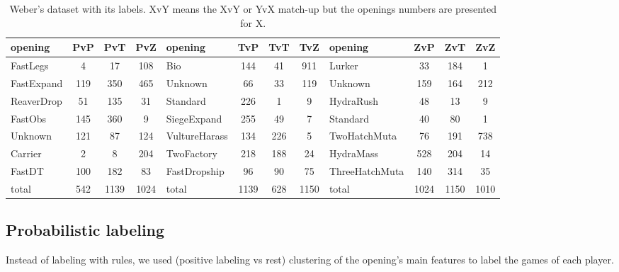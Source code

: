 \begin{table}[!h]
\begin{center}
\begin{footnotesize}
\begin{tabular}{|l|c|c|c|l|c|c|c|l|c|c|c|}
\hline
opening & PvP & PvT & PvZ & opening & TvP & TvT & TvZ & opening & ZvP & ZvT & ZvZ \\
\hline
FastLegs & 4 & 17 & 108 & Bio & 144 & 41 & 911 & Lurker & 33 & 184 & 1 \\
FastExpand & 119 & 350 & 465 & Unknown & 66 & 33 & 119 & Unknown & 159 & 164 & 212 \\
ReaverDrop & 51 & 135 & 31 & Standard & 226 & 1 & 9 & HydraRush & 48 & 13 & 9 \\
FastObs & 145 & 360 & 9 & SiegeExpand & 255 & 49 & 7 & Standard & 40 & 80 & 1 \\
Unknown & 121 & 87 & 124 & VultureHarass & 134 & 226 & 5 & TwoHatchMuta & 76 & 191 & 738 \\
Carrier & 2 & 8 & 204 & TwoFactory & 218 & 188 & 24 &  HydraMass & 528 & 204 & 14 \\
FastDT & 100 & 182 & 83 & FastDropship & 96 & 90 & 75 & ThreeHatchMuta & 140 & 314 & 35 \\
\hline
total & 542 & 1139 & 1024 & total & 1139 & 628 & 1150 & total & 1024 & 1150 & 1010 \\
\hline
\end{tabular}
\end{footnotesize}
\end{center}
\caption{Weber's dataset with its labels. XvY means the XvY or YvX match-up but the openings numbers are presented for X.}
\label{tab:weberdatasetnumbers}
\end{table}

\subsection{Probabilistic labeling}

Instead of labeling with rules, we used (positive labeling vs rest) clustering of the opening's main features to label the games of each player.

